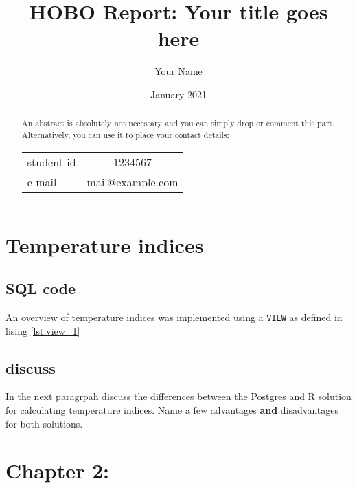 \documentclass[11pt]{scrartcl}
\title{HOBO Report: Your title goes here}
\author{Your Name}
\date{January 2021}
\newcommand\wordcount{
    \immediate\write18{texcount -sub=section \jobname.tex  | grep "Section" | sed -e 's/+.*//' | sed -n \thesection p > \jobname-words.sum}%
     words
}
\begin{document}
\maketitle

\begin{abstract}
    An abstract is absolutely not necessary and you can simply drop or comment this part.
    Alternatively, you can use it to place your contact details:\medskip\par 
    \begin{tabular}{lc}
       student-id  & 1234567 \\
        e-mail & mail@example.com
    \end{tabular}
\end{abstract}

\section{Temperature indices}

\subsection{SQL code}
An overview of temperature indices was implemented using a \texttt{VIEW} as defined in lising \ref{lst:view_1}



\subsection{discuss}

In the next paragrpah discuss the differences between the Postgres and R solution for calculating temperature indices. 
Name a few advantages \textbf{and} disadvantages for both solutions. 

\section{Chapter 2:}



\end{document}
